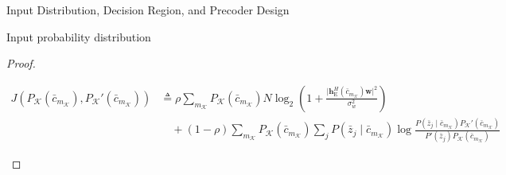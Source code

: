 \documentclass[journal]{IEEEtran}
\begin{document}
\begin{section}{Input Distribution, Decision Region, and Precoder Design}
\begin{subsection}{Input probability distribution}
\begin{proof}
				\begin{figure*}
					\begin{align}
						J \left( P_{\mathcal{K}}(\bar{c}_{m_{\mathcal{K}}}),P_{\mathcal{K}}'(\bar{c}_{m_{\mathcal{K}}}) \right)
						& \triangleq \rho \sum_{m_{\mathcal{K}}} P_{\mathcal{K}}(\bar{c}_{m_{\mathcal{K}}}) N \log_2 \left(1 + \frac{\lvert \boldsymbol{h}_{\mathrm{E}}^H(\bar{c}_{m_{\mathcal{K}}}) \boldsymbol{w} \rvert^2}{\sigma_w^2}\right)\nonumber\\
						& \quad + (1 - \rho) \sum_{m_{\mathcal{K}}} P_{\mathcal{K}}(\bar{c}_{m_{\mathcal{K}}}) \sum_j P(\bar{z}_j \mid \bar{c}_{m_{\mathcal{K}}}) \log \frac{P(\bar{z}_j \mid \bar{c}_{m_{\mathcal{K}}}) P_{\mathcal{K}}'(\bar{c}_{m_{\mathcal{K}}})}{P'(\bar{z}_j) P_{\mathcal{K}}(\bar{c}_{m_{\mathcal{K}}})}
						\label{eq:intermediate_information_function}
					\end{align}
				\end{figure*}



			\end{proof}



\end{subsection}
\end{section}
\end{document}
